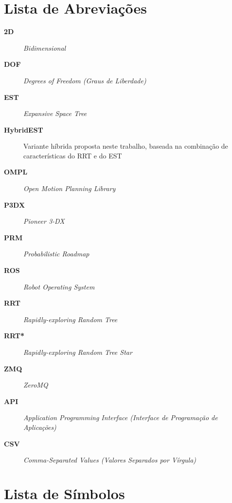 \chapter*{Lista de Abreviações}

\begin{description}
    \item[\textbf{2D}] \quad \textit{Bidimensional}
    
    \item[\textbf{DOF}] \quad \textit{Degrees of Freedom 
    (Graus de Liberdade)}
    
    \item[\textbf{EST}] \quad \textit{Expansive Space Tree}
    
    \item[\textbf{HybridEST}] \quad Variante híbrida proposta neste trabalho, 
    baseada na combinação de características do RRT e do EST
    
    \item[\textbf{OMPL}] \quad \textit{Open Motion Planning Library}
    
    \item[\textbf{P3DX}] \quad \textit{Pioneer 3-DX}
    
    \item[\textbf{PRM}] \quad \textit{Probabilistic Roadmap}
    
    \item[\textbf{ROS}] \quad \textit{Robot Operating System}
    
    \item[\textbf{RRT}] \quad \textit{Rapidly-exploring Random Tree}
    
    \item[\textbf{RRT*}] \quad \textit{Rapidly-exploring Random Tree Star}
    
    \item[\textbf{ZMQ}] \quad \textit{ZeroMQ}

      \item[\textbf{API}] \quad \textit{Application Programming Interface 
    (Interface de Programação de Aplicações)}
    
    \item[\textbf{CSV}] \quad \textit{Comma-Separated Values 
    (Valores Separados por Vírgula)}
\end{description}

\chapter*{Lista de Símbolos}

